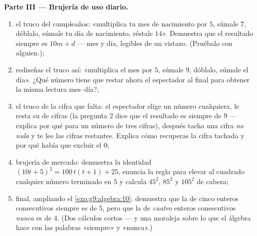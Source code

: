 \begin{problem}
\medskip
\noindent\textbf{Parte III --- Brujería de uso diario.}
\begin{enumerate}[resume]
  \item el truco del cumpleaños: «multiplica tu mes de nacimiento por $5$,
        súmale $7$, dóblalo, súmale tu día de nacimiento, réstale $14$».
        Demuestra que el resultado siempre es $10m + d$ --- mes y
        día, legibles de un vistazo. (Pruébalo con alguien.);
  \item rediseñas el truco así: «multiplica el mes por $5$,
        súmale $9$, dóblalo, súmale el día». ¿Qué número tiene que
        restar ahora el espectador al final para obtener la misma
        lectura mes--día?;
  \item el truco de la cifra que falta: el espectador elige un número cualquiera,
        le resta su  de cifras (la pregunta 2 dice que el resultado es
        siempre  de $9$ --- explica por qué para un
        número de tres cifras), después tacha una cifra \emph{no nula}
        y te lee las cifras restantes. Explica cómo
        recuperas la cifra tachada y por qué había que
        excluir el $0$;
  \item brujería de mercado: demuestra la identidad
        $(10t + 5)^2 = 100\,t(t+1) + 25$, enuncia la regla para
        elevar al cuadrado cualquier número terminado en $5$ y calcula $45^2$,
        $85^2$ y $105^2$ de cabeza;
  \item final, ampliando el \cref{exo:g9:algebra:10}: demuestra que
        la  de cinco enteros consecutivos siempre es
         de $5$, pero que la  de \emph{cuatro}
        enteros consecutivos \emph{nunca} es  de $4$.
        (Dos cálculos cortos --- y una moraleja sobre lo que
        el álgebra hace con las palabras «siempre» y «nunca».)
\end{enumerate}
\end{problem}
